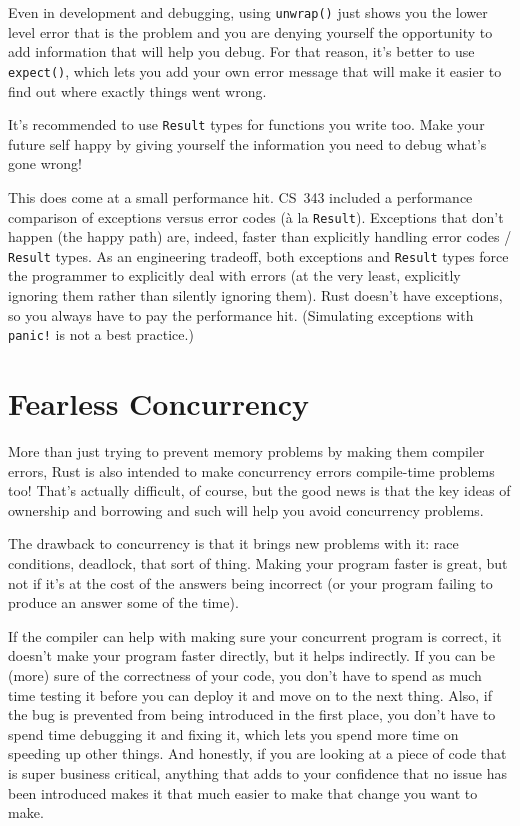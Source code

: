 Even in development and debugging, using \texttt{unwrap()} just shows you the lower level error that is the problem and you are denying yourself the opportunity to add information that will help you debug. For that reason, it's better to use \texttt{expect()}, which lets you add your own error message that will make it easier to find out where exactly things went wrong.

It's recommended to use \texttt{Result} types for functions you write too. Make your future self happy by giving yourself the information you need to debug what's gone wrong!

This does come at a small performance hit. CS~343 included a performance comparison of exceptions versus error codes (\`a la \texttt{Result}). Exceptions that don't happen (the happy path) are, indeed, faster than explicitly handling error codes / \texttt{Result} types. As an engineering tradeoff, both exceptions and \texttt{Result} types force the programmer to explicitly deal with errors (at the very least, explicitly ignoring them rather than silently ignoring them). Rust doesn't have exceptions, so you always have to pay the performance hit. (Simulating exceptions with \texttt{panic!} is not a best practice.)

\section*{Fearless Concurrency}
More than just trying to prevent memory problems by making them compiler errors, Rust is also intended to make concurrency errors compile-time problems too! That's actually difficult, of course, but the good news is that the key ideas of ownership and borrowing and such will help you avoid concurrency problems.

The drawback to concurrency is that it brings new problems with it: race conditions, deadlock, that sort of thing. Making your program faster is great, but not if it's at the cost of the answers being incorrect (or your program failing to produce an answer some of the time).

If the compiler can help with making sure your concurrent program is correct, it doesn't make your program faster directly, but it helps indirectly. If you can be (more) sure of the correctness of your code, you don't have to spend as much time testing it before you can deploy it and move on to the next thing. Also, if the bug is prevented from being introduced in the first place, you don't have to spend time debugging it and fixing it, which lets you spend more time on speeding up other things. And honestly, if you are looking at a piece of code that is super business critical, anything that adds to your confidence that no issue has been introduced makes it that much easier to make that change you want to make.

